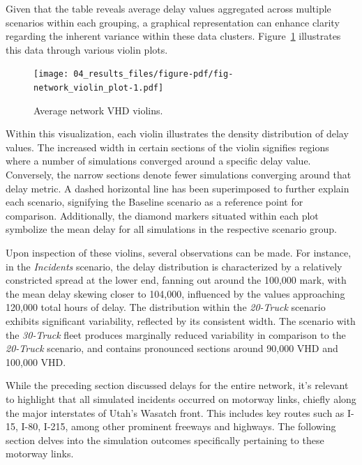 \documentclass[fancy, oneside, mastersfancy, ms]{byuthesis}
\begin{document}
Given that the table reveals average delay values aggregated across
multiple scenarios within each grouping, a graphical representation can
enhance clarity regarding the inherent variance within these data
clusters. Figure~\ref{fig-network_violin_plot} illustrates this data
through various violin plots.

\begin{figure}

{\centering \texttt{[image: 04\_results\_files/figure-pdf/fig-network\_violin\_plot-1.pdf]}

}

\caption{\label{fig-network_violin_plot}Average network VHD violins.}

\end{figure}

Within this visualization, each violin illustrates the density
distribution of delay values. The increased width in certain sections of
the violin signifies regions where a number of simulations converged
around a specific delay value. Conversely, the narrow sections denote
fewer simulations converging around that delay metric. A dashed
horizontal line has been superimposed to further explain each scenario,
signifying the Baseline scenario as a reference point for comparison.
Additionally, the diamond markers situated within each plot symbolize
the mean delay for all simulations in the respective scenario group.

Upon inspection of these violins, several observations can be made. For
instance, in the \emph{Incidents} scenario, the delay distribution is
characterized by a relatively constricted spread at the lower end,
fanning out around the 100,000 mark, with the mean delay skewing closer
to 104,000, influenced by the values approaching 120,000 total hours of
delay. The distribution within the \emph{20-Truck} scenario exhibits
significant variability, reflected by its consistent width. The scenario
with the \emph{30-Truck} fleet produces marginally reduced variability
in comparison to the \emph{20-Truck} scenario, and contains pronounced
sections around 90,000 VHD and 100,000 VHD.

While the preceding section discussed delays for the entire network,
it's relevant to highlight that all simulated incidents occurred on
motorway links, chiefly along the major interstates of Utah's Wasatch
front. This includes key routes such as I-15, I-80, I-215, among other
prominent freeways and highways. The following section delves into the
simulation outcomes specifically pertaining to these motorway links.
\end{document}
